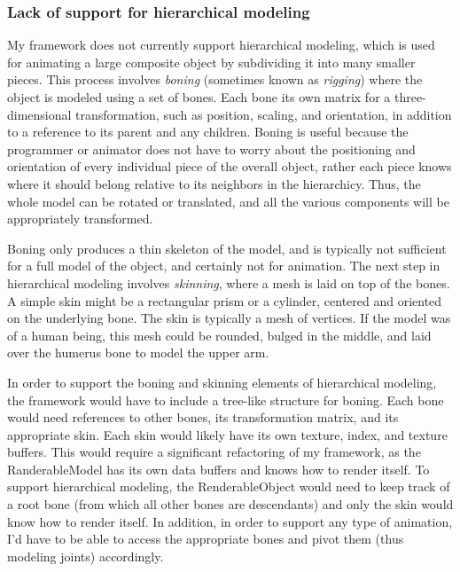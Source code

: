 \documentclass[journal]{IEEEtran}
\begin{document}
\subsubsection{Lack of support for hierarchical modeling}

My framework does not currently support hierarchical modeling, which is used for animating a large composite object by subdividing it into many smaller pieces. This process involves \textit{boning} (sometimes known as \textit{rigging}) where the object is modeled using a set of bones. Each bone its own matrix for a three-dimensional transformation, such as position, scaling, and orientation, in addition to a reference to its parent and any children. Boning is useful because the programmer or animator does not have to worry about the positioning and orientation of every individual piece of the overall object, rather each piece knows where it should belong relative to its neighbors in the hierarchicy. Thus, the whole model can be rotated or translated, and all the various components will be appropriately transformed.

Boning only produces a thin skeleton of the model, and is typically not sufficient for a full model of the object, and certainly not for animation. The next step in hierarchical modeling involves \textit{skinning}, where a mesh is laid on top of the bones. A simple skin might be a rectangular prism or a cylinder, centered and oriented on the underlying bone. The skin is typically a mesh of vertices. If the model was of a human being, this mesh could be rounded, bulged in the middle, and laid over the humerus bone to model the upper arm.

In order to support the boning and skinning elements of hierarchical modeling, the framework would have to include a tree-like structure for boning. Each bone would need references to other bones, its transformation matrix, and its appropriate skin. Each skin would likely have its own texture, index, and texture buffers. This would require a significant refactoring of my framework, as the RanderableModel has its own data buffers and knows how to render itself. To support hierarchical modeling, the RenderableObject would need to keep track of a root bone (from which all other bones are descendants) and only the skin would know how to render itself. In addition, in order to support any type of animation, I'd have to be able to access the appropriate bones and pivot them (thus modeling joints) accordingly.
\end{document}

